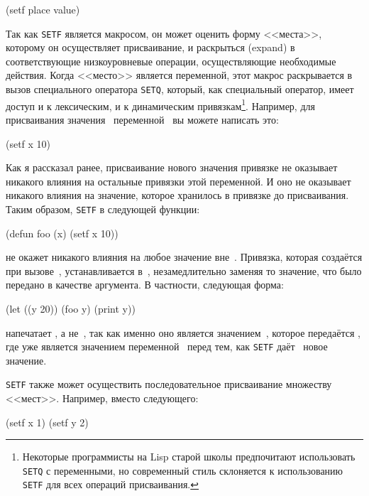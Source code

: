 \begin{myverb}
  (setf place value)
\end{myverb}

Так как \lstinline{SETF} является макросом, он может оценить форму <<места>>, которому он
осуществляет присваивание, и раскрыться (expand) в соответствующие низкоуровневые
операции, осуществляющие необходимые действия. Когда <<место>> является переменной, этот
макрос раскрывается в вызов специального оператора \lstinline{SETQ}, который, как специальный
оператор, имеет доступ и к лексическим, и к динамическим привязкам\footnote{Некоторые
  программисты на Lisp старой школы предпочитают использовать \lstinline{SETQ} с переменными,
  но современный стиль склоняется к использованию \lstinline{SETF} для всех операций
  присваивания.}. Например, для присваивания значения~ переменной~ вы можете написать
это:

\begin{myverb}
  (setf x 10)
\end{myverb}

Как я рассказал ранее, присваивание нового значения привязке не оказывает никакого влияния
на остальные привязки этой переменной. И оно не оказывает никакого влияния на значение,
которое хранилось в привязке до присваивания. Таким образом, \lstinline{SETF} в следующей
функции:

\begin{myverb}
  (defun foo (x) (setf x 10))
\end{myverb}

\noindent{}не окажет никакого влияния на любое значение вне~. Привязка, которая создаётся при
вызове~, устанавливается в~, незамедлительно заменяя то значение, что было передано в
качестве аргумента. В частности, следующая форма:

\begin{myverb}
  (let ((y 20))
    (foo y)
    (print y))
\end{myverb}

\noindent{}напечатает , а не~, так как именно оно является значением~, которое передаётся
, где уже является значением переменной~ перед тем, как \lstinline{SETF}
даёт~ новое значение.

\lstinline{SETF} также может осуществить последовательное присваивание множеству
<<мест>>. Например, вместо следующего:

\begin{myverb}
  (setf x 1)
  (setf y 2)
\end{myverb}


